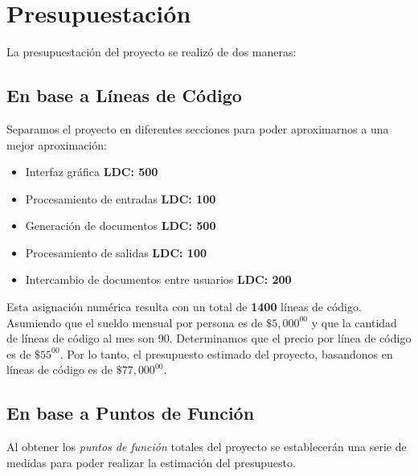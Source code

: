 \documentclass[letterpaper]{article}
\begin{document}
\section{Presupuestación}
La presupuestación del proyecto se realizó de dos maneras:

\subsection{En base a Líneas de Código}
Separamos el proyecto en diferentes secciones para poder aproximarnos a una mejor aproximación:

\begin{itemize}
\item Interfaz gráfica \textbf{LDC: 500}
\item Procesamiento de entradas \textbf{LDC: 100}
\item Generación de documentos \textbf{LDC: 500}
\item Procesamiento de salidas \textbf{LDC: 100}
\item Intercambio de documentos entre usuarios \textbf{LDC: 200}
\end{itemize}

Esta asignación numérica resulta con un total de \textbf{1400} líneas de código. Asumiendo que el sueldo mensual por persona es de $\$5,000^{00}$ y que la cantidad de líneas de código al mes son 90. Determinamos que el precio por línea de código es de $\$55^{00}$. Por lo tanto, el presupuesto estimado del proyecto, basandonos en líneas de código es de $\$77,000^{00}$.

\subsection{En base a Puntos de Función}
Al obtener los \emph{puntos de función} totales del proyecto se establecerán una serie de medidas para poder realizar la estimación del presupuesto.
\end{document}

